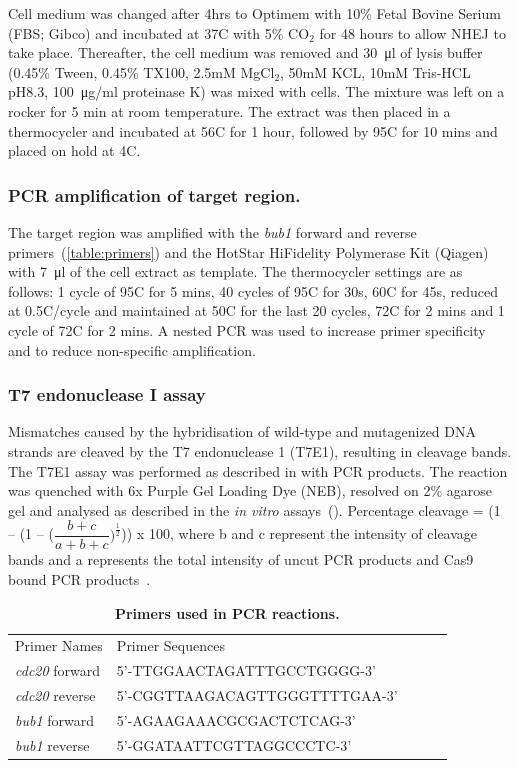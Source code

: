 \documentclass[11pt]{article}
\begin{document}
Cell medium was changed after 4hrs to Optimem with 10\% Fetal Bovine Serium (FBS; Gibco) and incubated at 37\degree C with 5\% CO$_{2}$ for 48 hours to allow NHEJ to take place. Thereafter, the cell medium was removed and \SI{30}{\micro\litre} of lysis buffer (0.45\% Tween, 0.45\% TX100, 2.5mM MgCl$_{2}$, 50mM KCL, 10mM Tris-HCL pH8.3, \SI{100}{\micro\gram/\milli\litre} proteinase K) was mixed with cells. The mixture was left on a rocker for 5 min at room temperature. The extract was then placed in a thermocycler and incubated at 56\degree C for 1 hour, followed by 95\degree C for 10 mins and placed on hold at 4\degree C. 

\subsubsection{PCR amplification of target region.}
The target region was amplified with the \textit{bub1} forward and reverse primers~(\autoref{table:primers}) and the HotStar HiFidelity Polymerase Kit (Qiagen) with \SI{7}{\micro\litre} of the cell extract as template. The thermocycler settings are as follows: 1 cycle of 95\degree C for 5 mins, 40 cycles of 95\degree C for 30s, 60\degree C for 45s, reduced at 0.5\degree C/cycle and maintained at 50\degree C for the last 20 cycles, 72\degree C for 2 mins and 1 cycle of 72\degree C for 2 mins. A nested PCR was used to increase primer specificity and to reduce non-specific amplification.

\subsubsection{T7 endonuclease I assay}
Mismatches caused by the hybridisation of wild-type and mutagenized DNA strands are cleaved by the T7 endonuclease 1 (T7E1), resulting in cleavage bands. The T7E1 assay was performed as described in \cite{Lin2014b} with PCR products. The reaction was quenched with 6x Purple Gel Loading Dye (NEB), resolved on 2\% agarose gel and analysed as described in the \textit{in vitro} assays~(). Percentage cleavage = (1 -- (1 -- ($\dfrac{b + c}{a + b + c})^{\frac{1}{2}}$)) x 100, where b and c represent the intensity of cleavage bands and a represents the total intensity of uncut PCR products and Cas9 bound PCR products~\citep{Ran2013}. 

\begin{table}[h]
\centering
\caption{\textbf{Primers used in PCR reactions.}}
\label{table:primers}
\begin{tabular}{|l|l|lll}
\cline{1-2}
Primer Names & Primer Sequences\\ \cline{1-2}
\textit{cdc20} forward & 5'-TTGGAACTAGATTTGCCTGGGG-3' \\ \cline{1-2}
\textit{cdc20} reverse & 5'-CGGTTAAGACAGTTGGGTTTTGAA-3' \\ \cline{1-2}
\textit{bub1} forward & 5'-AGAAGAAACGCGACTCTCAG-3' \\ \cline{1-2}
\textit{bub1} reverse & 5'-GGATAATTCGTTAGGCCCTC-3' \\ \cline{1-2}
\end{tabular}
\end{table}
\end{document}
